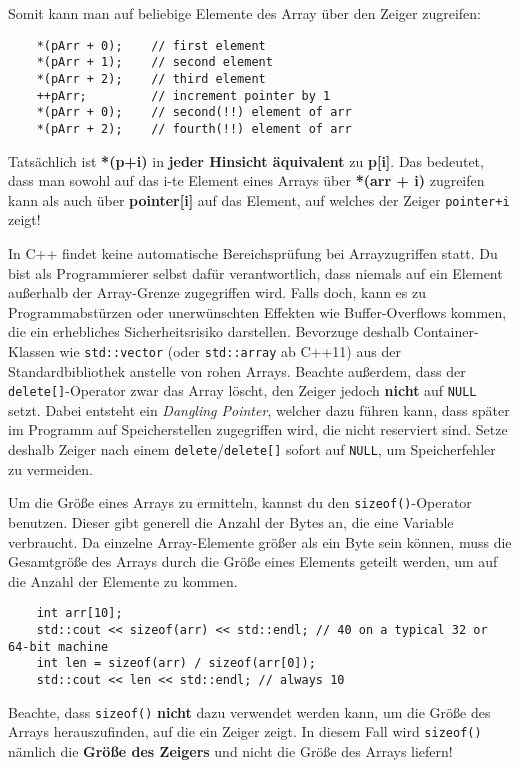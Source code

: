 Somit kann man auf beliebige Elemente des Array über den Zeiger zugreifen:

\begin{lstlisting}
	*(pArr + 0);	// first element
	*(pArr + 1);	// second element
	*(pArr + 2);	// third element
	++pArr;			// increment pointer by 1
	*(pArr + 0);	// second(!!) element of arr
	*(pArr + 2);	// fourth(!!) element of arr
\end{lstlisting}

Tatsächlich ist \textbf{*(p+i)} in \textbf{jeder Hinsicht äquivalent} zu \textbf{p[i]}.
Das bedeutet, dass man sowohl auf das i-te Element eines Arrays über \textbf{*(arr + i)} zugreifen kann als auch über \textbf{pointer[i]} auf das Element, auf welches der Zeiger \lstinline{pointer+i} zeigt!

In C++ findet keine automatische Bereichsprüfung bei Arrayzugriffen statt.
Du bist als Programmierer selbst dafür verantwortlich, dass niemals auf ein Element außerhalb der Array-Grenze zugegriffen wird.
Falls doch, kann es zu Programmabstürzen oder unerwünschten Effekten wie Buffer-Overflows kommen, die ein erhebliches Sicherheitsrisiko darstellen.
Bevorzuge deshalb Container-Klassen wie \lstinline{std::vector} (oder \lstinline{std::array} ab C++11) aus der Standardbibliothek anstelle von \glqq rohen\grqq{} Arrays.
Beachte außerdem, dass der \lstinline{delete[]}-Operator zwar das Array löscht, den Zeiger jedoch \textbf{nicht} auf \lstinline{NULL} setzt.
Dabei entsteht ein \emph{Dangling Pointer}, welcher dazu führen kann, dass später im Programm auf Speicherstellen zugegriffen wird, die nicht reserviert sind.
Setze deshalb Zeiger nach einem \lstinline{delete}/\lstinline{delete[]} sofort auf \lstinline{NULL}, um Speicherfehler zu vermeiden.

Um die Größe eines Arrays zu ermitteln, kannst du den \lstinline{sizeof()}-Operator benutzen.
Dieser gibt generell die Anzahl der Bytes an, die eine Variable verbraucht.
Da einzelne Array-Elemente größer als ein Byte sein können, muss die Gesamtgröße des Arrays durch die Größe eines Elements geteilt werden, um auf die Anzahl der Elemente zu kommen.

\begin{lstlisting}
	int arr[10];
	std::cout << sizeof(arr) << std::endl; // 40 on a typical 32 or 64-bit machine
	int len = sizeof(arr) / sizeof(arr[0]);
	std::cout << len << std::endl; // always 10
\end{lstlisting}

Beachte, dass \lstinline{sizeof()} \textbf{nicht} dazu verwendet werden kann, um die Größe des Arrays herauszufinden, auf die ein Zeiger zeigt.
In diesem Fall wird \lstinline{sizeof()} nämlich die \textbf{Größe des Zeigers} und nicht die Größe des Arrays liefern!

